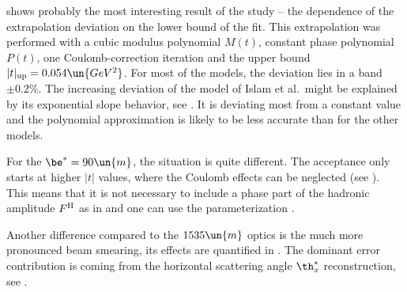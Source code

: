  shows probably the most interesting result of the study -- the dependence of the extrapolation deviation on the lower bound of the fit. This extrapolation was performed with a cubic modulus polynomial $M(t)$, constant phase polynomial $P(t)$, one Coulomb-correction iteration and the upper bound $|t|_{\rm up} = 0.054\un{GeV^2}$. For most of the models, the deviation lies in a band $\pm 0.2\percent$. The increasing deviation of the model of Islam et al.~might be explained by its exponential slope behavior, see . It is deviating most from a constant value and the polynomial approximation is likely to be less accurate than for the other models.





\def\OutlineLabel{Extrapolation for beta* = 90 m optics}

For the $\be^* = 90\un{m}$, the situation is quite different. The acceptance only starts at higher $|t|$ values, where the Coulomb effects can be neglected (see ). This means that it is not necessary to include a phase part of the hadronic amplitude $F^{\rm H}$ as in  and one can use the parameterization . 

Another difference compared to the $1535\un{m}$ optics is the much more pronounced beam smearing, its effects are quantified in . The dominant error contribution is coming from the horizontal scattering angle $\th_x^*$ reconstruction, see .

